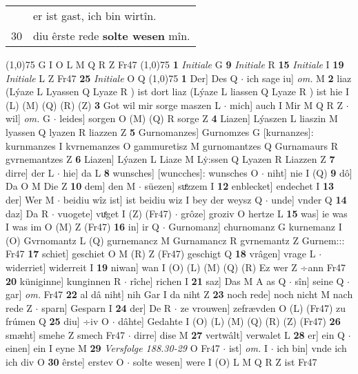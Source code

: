 \documentclass[8pt,a4paper,notitlepage]{article}
\begin{document}
\begin{table}[ht]
\begin{minipage}[t]{0.5\linewidth}
\begin{tabular}{rl}
 & er ist gast, ich bin wirtîn.\\ 
30 & diu êrste rede \textbf{solte wesen} mîn.\\ 
\end{tabular}
\scriptsize
\line(1,0){75} \newline
G I O L M Q R Z Fr47 \newline
\line(1,0){75} \newline
\textbf{1} \textit{Initiale} G  \textbf{9} \textit{Initiale} R  \textbf{15} \textit{Initiale} I  \textbf{19} \textit{Initiale} L Z Fr47  \textbf{25} \textit{Initiale} O Q  \newline
\line(1,0){75} \newline
\textbf{1} Der] Des Q  $\cdot$ ich sage iu] \textit{om.} M \textbf{2} liaz (Lýaze L Lyassen Q Lyaze R ) ist dort liaz (Lýaze L liassen Q Lyaze R ) ist hie I (L) (M) (Q) (R) (Z) \textbf{3} Got wil mir sorge maszen L  $\cdot$ mich] auch I Mir M Q R Z  $\cdot$ wil] \textit{om.} G  $\cdot$ leides] sorgen O (M) (Q) R sorge Z \textbf{4} Liazen] Lýaszen L liaszin M lyassen Q lyazen R liazzen Z \textbf{5} Gurnomanzes] Gurnomzes G [kurnanzes]: kurnmanzes I kvrnemanzes O gammuretisz M gurnomantzes Q Gurnamaurs R gvrnemantzes Z \textbf{6} Liazen] Lýazen L Liaze M Lẏ:ssen Q Lyazen R Liazzen Z \textbf{7} dirre] der L  $\cdot$ hie] da L \textbf{8} wunsches] [wuncches]: wunsches O  $\cdot$ niht] nie I (Q) \textbf{9} dô] Da O M Die Z \textbf{10} dem] den M  $\cdot$ süezen] suͤzzem I \textbf{12} enblecket] endechet I \textbf{13} der] Wer M  $\cdot$ beidiu wîz ist] ist beidiu wiz I bey der weysz Q  $\cdot$ unde] vnder Q \textbf{14} daz] Da R  $\cdot$ vuogete] vuͤget I (Z) (Fr47)  $\cdot$ grôze] groziv O hertze L \textbf{15} was] ie was I was im O (M) Z (Fr47) \textbf{16} in] ir Q  $\cdot$ Gurnomanz] churnomanz G kurnemanz I (O) Gvrnomantz L (Q) gurnemancz M Gurnamancz R gvrnemantz Z Gurnem::: Fr47 \textbf{17} schiet] geschiet O M (R) Z (Fr47) geschigt Q \textbf{18} vrâgen] vrage L  $\cdot$ widerriet] widerreit I \textbf{19} niwan] wan I (O) (L) (M) (Q) (R) Ez wer Z ÷ann Fr47 \textbf{20} küniginne] kunginnen R  $\cdot$ rîche] richen I \textbf{21} saz] Das M A as Q  $\cdot$ sîn] seine Q  $\cdot$ gar] \textit{om.} Fr47 \textbf{22} al dâ niht] nih Gar I da niht Z \textbf{23} noch rede] noch nicht M nach rede Z  $\cdot$ sparn] Gesparn I \textbf{24} der] De R  $\cdot$ ze vrouwen] zefrævden O (L) (Fr47) zu frúmen Q \textbf{25} diu] ÷iv O  $\cdot$ dâhte] Gedahte I (O) (L) (M) (Q) (R) (Z) (Fr47) \textbf{26} smæht] smehe Z smech Fr47  $\cdot$ dirre] dise M \textbf{27} vertwâlt] verwalet L \textbf{28} er] ein Q  $\cdot$ einen] ein I eyne M \textbf{29} \textit{Versfolge 188.30-29} O Fr47   $\cdot$ ist] \textit{om.} I  $\cdot$ ich bin] vnde ich ich div O \textbf{30} êrste] erstev O  $\cdot$ solte wesen] were I (O) L M Q R Z ist Fr47 \newline

\end{minipage}
\end{table}
\end{document}
